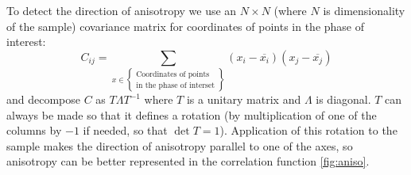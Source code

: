 \documentclass[reprint,amsmath,amssymb,aps,pre,showkeys,showpacs]{revtex4-1}
\begin{document}
To detect the direction of anisotropy we use an $N \times N$ (where $N$ is
dimensionality of the sample) covariance matrix for coordinates of points in the
phase of interest:
\begin{equation}
  C_{ij} = \sum_{x \in \left\{
    \begin{array}{l}
      \text{Coordinates of points} \\
      \text{in the phase of interset}
    \end{array}
    \right\}} (x_i - \overline{x_i})(x_j - \overline{x_j})
\end{equation}
and decompose $C$ as $T \Lambda T^{-1}$ where $T$ is a unitary matrix and
$\Lambda$ is diagonal. $T$ can always be made so that it defines a rotation (by
multiplication of one of the columns by $-1$ if needed, so that
$\det T = 1$). Application of this rotation to the sample makes the direction of
anisotropy parallel to one of the axes, so anisotropy can be better represented in
the correlation function \cref{fig:aniso}.
\end{document}
